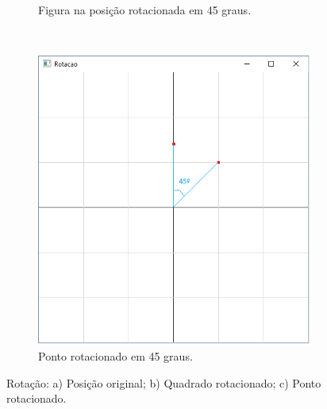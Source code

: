 \begin{figure}[H]
\begin{subfigure}{.25\textwidth}
    \caption{Figura na posição rotacionada em 45 graus.} 
  \end{subfigure}
  ~
  \begin{subfigure}{.25\textwidth}
    \includegraphics[width=.9\textwidth]{img/linear2c}
    \caption{Ponto rotacionado em 45 graus.} 
  \end{subfigure}
\label{fig:linear2}
\caption{Rotação: a) Posição original; b) Quadrado rotacionado; c) Ponto rotacionado.} 
\end{figure}

